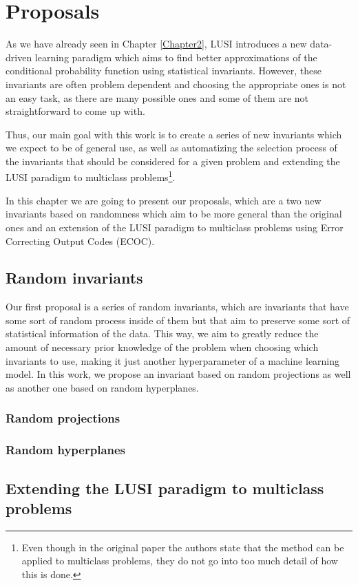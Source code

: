 
\chapter{Proposals} %
\label{Chapter3}

As we have already seen in Chapter \ref{Chapter2}, LUSI introduces a new data-driven learning
paradigm which aims to find better approximations of the conditional probability function using
statistical invariants. However, these invariants are often problem dependent and choosing the
appropriate ones is not an easy task, as there are many possible ones and some of them are not
straightforward to come up with.

Thus, our main goal with this work is to create a series of new invariants which we expect to be of
general use, as well as automatizing the selection process of the invariants that should be considered
for a given problem and extending the LUSI paradigm to multiclass problems\footnote{Even though in the
original paper the authors state that the method can be applied to multiclass problems, they do not go
into too much detail of how this is done.}.

In this chapter we are going to present our proposals, which are a two new invariants based on randomness
which aim to be more general than the original ones and an extension of the LUSI paradigm to multiclass problems
using Error Correcting Output Codes (ECOC).

\section{Random invariants}

Our first proposal is a series of random invariants, which are invariants that have some sort of random
process inside of them but that aim to preserve some sort of statistical information of the data. This way,
we aim to greatly reduce the amount of necessary prior knowledge of the problem when choosing which invariants
to use, making it just another hyperparameter of a machine learning model. In this work, we propose
an invariant based on random projections as well as another one based on random hyperplanes.

\subsection{Random projections}

\subsection{Random hyperplanes}

\section{Extending the LUSI paradigm to multiclass problems}

